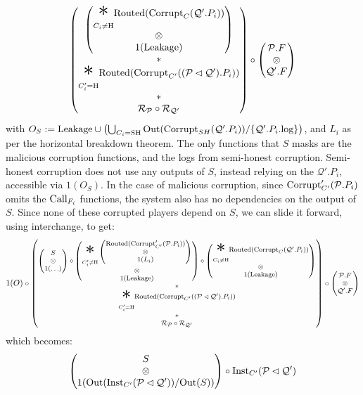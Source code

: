 \begin{theorem}
$$\begin{pmatrix}
\begin{pmatrix}
    {\displaystyle \bigast_{C_i \neq \tx{H}}}
    \tx{Routed}(\tx{Corrupt}_C(\mathcal{Q}'.P_i))
    \cr
    \otimes\cr
    1(\tx{Leakage})
    \end{pmatrix}
    \cr
    *\cr
    {\displaystyle \bigast_{C'_i = \tx{H}}}
    \tx{Routed}(\tx{Corrupt}_{C'}((\mathcal{P} \lhd \mathcal{Q}').P_i))\cr
    *\cr
    \mathcal{R}_{\mathcal{P}} \circ \mathcal{R}_{\mathcal{Q}'}\cr
  \end{pmatrix}
  \circ
  \begin{pmatrix}
    \mathcal{P}.F\cr
    \otimes\cr
    \mathcal{Q}'.F
  \end{pmatrix}
  $$
  with $O_S := \text{Leakage} \cup \left(\bigcup_{C_i = \text{SH}} \text{Out}(\text{Corrupt}_{SH}(\mathcal{Q}'.P_i)) / \{\mathcal{Q}'.P_i.\text{log}\}\right)$,
  and $L_i$ as per the horizontal breakdown theorem.
  The only functions that $S$ masks are the malicious corruption
  functions, and the logs from semi-honest corruption.
  Semi-honest corruption does not use any outputs of $S$,
  instead relying on the $\mathcal{Q}'.P_i$, accessible via $1(O_S)$.
  In the case of malicious corruption, since $\text{Corrupt}'_{C'}(\mathcal{P}.P_i)$
  omits the $\text{Call}_{F_i}$ functions, the system also has no dependencies
  on the output of $S$.
  Since none of these corrupted players depend on $S$,
  we can slide it forward, using interchange, to get:
  $$
  \footnotesize
  1(O) \circ
  \begin{pmatrix}
    \begin{pmatrix}
      S\cr
      \otimes\cr
      1(\ldots)
    \end{pmatrix}
    \circ
    \begin{pmatrix}
    {\displaystyle \bigast_{C'_i \neq \tx{H}}}
    \begin{pmatrix}
      \tx{Routed}(\tx{Corrupt}'_{C'}(\mathcal{P}.P_i))\cr
      \otimes\cr
      1(L_i)
    \end{pmatrix}\cr
    \otimes\cr
    1(\tx{Leakage})
    \end{pmatrix}
    \circ
    \begin{pmatrix}
    {\displaystyle \bigast_{C_i \neq \tx{H}}}
    \tx{Routed}(\tx{Corrupt}_C(\mathcal{Q}'.P_i))
    \cr
    \otimes\cr
    1(\tx{Leakage})
    \end{pmatrix}
    \cr
    *\cr
    {\displaystyle \bigast_{C'_i = \tx{H}}}
    \tx{Routed}(\tx{Corrupt}_{C'}((\mathcal{P} \lhd \mathcal{Q}').P_i))\cr
    *\cr
    \mathcal{R}_{\mathcal{P}} \circ \mathcal{R}_{\mathcal{Q}'}\cr
  \end{pmatrix}
  \circ
  \begin{pmatrix}
    \mathcal{P}.F\cr
    \otimes\cr
    \mathcal{Q}'.F
  \end{pmatrix}
  $$
  which becomes:
  $$
  \begin{pmatrix}
    S\cr
    \otimes\cr
    1(\text{Out}(\text{Inst}_{C'}(\mathcal{P} \lhd \mathcal{Q}')) / \text{Out}(S))
  \end{pmatrix}
  \circ
  \text{Inst}_{C'}(\mathcal{P} \lhd \mathcal{Q}')
  $$


\end{theorem}
